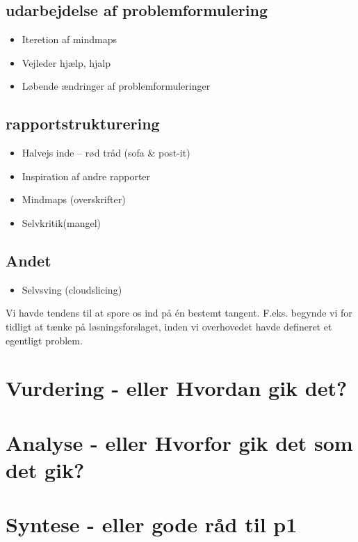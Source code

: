 \subsection{udarbejdelse af problemformulering}
\begin{itemize}
\item Iteretion af mindmaps
\item Vejleder hjælp, hjalp
\item Løbende ændringer af problemformuleringer

\end{itemize}

\subsection{rapportstrukturering}
\begin{itemize}
\item Halvejs inde – rød tråd (sofa \& post-it)
\item Inspiration af andre rapporter
\item Mindmaps (overskrifter)
\item  Selvkritik(mangel)
\end{itemize}

\subsection{Andet}
\begin{itemize}

\item Selvsving (cloudslicing) 
\end{itemize}

Vi havde tendens til at spore os ind på én bestemt tangent. F.eks. begynde vi for tidligt at tænke på løsningsforslaget, inden vi overhovedet havde defineret et egentligt problem.



\section{Vurdering - eller Hvordan gik det?}



\section{Analyse - eller Hvorfor gik det som det gik?}



\section{Syntese - eller gode råd til p1}








